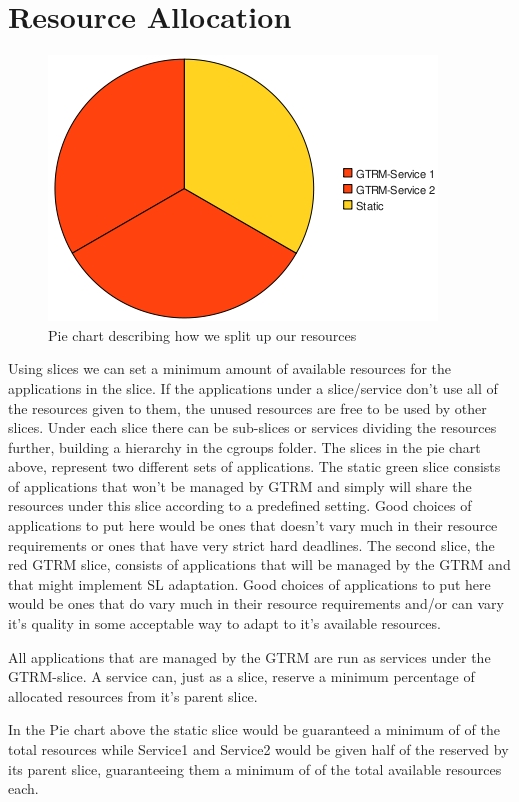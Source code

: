 \documentclass{LTHthesis}
\begin{document}
\section{Resource Allocation}
\begin{figure}
    \centering
    \includegraphics{piechart.jpeg}
    \caption{Pie chart describing how we split up our resources}
    \label{fig:Piechart}
\end{figure}
Using slices we can set a minimum amount of available resources for the applications in the slice. If the applications under a slice/service don’t use all of the resources given to them, the unused resources are free to be used by other slices. Under each slice there can be sub-slices or services dividing the resources further, building a hierarchy in the cgroups folder. The slices in the pie chart above, represent two different sets of applications. The static green slice consists of applications that won’t be managed by GTRM and simply will share the resources under this slice according to a predefined setting. Good choices of applications to put here would be ones that doesn’t vary much in their resource requirements or ones that have very strict hard deadlines. The second slice, the red GTRM slice, consists of applications that will be managed by the GTRM and that might implement SL adaptation. Good choices of applications to put here would be ones that do vary much in their resource requirements and/or can vary it’s quality in some acceptable way to adapt to it’s available resources.

All applications that are managed by the GTRM are run as services under the GTRM-slice. A service can, just as a slice, reserve a minimum percentage of allocated resources from it’s parent slice.

In the Pie chart above the static slice would be guaranteed a minimum of  of the total resources while Service1 and Service2 would be given half of the  reserved by its parent slice, guaranteeing  them a minimum of  of the total available resources each.
\end{document}
